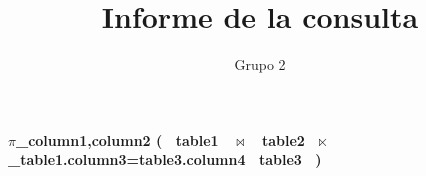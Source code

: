 \documentclass{article}
\begin{document}
\title{Informe de la consulta}
\author{Grupo 2}
\maketitle
\textbf{\Large{\newline$\pi$_{column1,column2}
(  \ table1 \ $\bowtie$ \ table2 \ $\ltimes$_{table1.column3=table3.column4} \ table3 \  )
}
}
\end{document}
